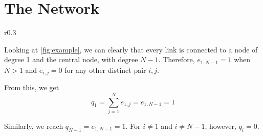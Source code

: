 \section{The Network}

\begin{wrapfigure}{r}{0.3\textwidth}
    \centering
    

    \caption{Star network with $N = 13$ nodes.}
    \label{fig:example}
\end{wrapfigure}

Looking at \cref{fig:example}, we can clearly that every link is connected to a node of degree 1 and the central node, with degree $N-1$. Therefore, $e_{1,N-1} = 1$ when $N > 1$ and $e_{i,j} = 0$ for any other distinct pair $i,j$.

From this, we get \[
    q_1 = \sum_{j = 1}^N e_{1,j} = e_{1,N-1} = 1
\]

Similarly, we reach $q_{N-1} = e_{1,N-1} = 1$. For $i \ne 1$ and $i \ne N-1$, however, $q_i = 0$.

